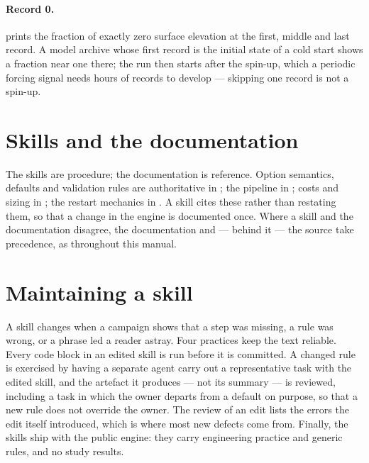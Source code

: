 \paragraph{Record 0.}  prints the fraction of exactly zero surface elevation at
the first, middle and last record. A model archive whose first record is the initial state of a cold
start shows a fraction near one there; the run then starts after the spin-up, which a periodic
forcing signal needs hours of records to develop --- skipping one record is not a spin-up.


\section{Skills and the documentation}\label{sec:skills-docs}

The skills are procedure; the documentation is reference. Option semantics, defaults and validation
rules are authoritative in ; the pipeline in
; costs and sizing in ; the restart
mechanics in . A skill cites these rather than restating them, so that
a change in the engine is documented once. Where a skill and the documentation disagree, the
documentation and --- behind it --- the source take precedence, as throughout this manual.

\section{Maintaining a skill}\label{sec:skills-maintain}

A skill changes when a campaign shows that a step was missing, a rule was wrong, or a phrase led a
reader astray. Four practices keep the text reliable. Every code block in an edited skill is run
before it is committed. A changed rule is exercised by having a separate agent carry out a
representative task with the edited skill, and the artefact it produces --- not its summary --- is
reviewed, including a task in which the owner departs from a default on purpose, so that a new rule
does not override the owner. The review of an edit lists the errors the edit itself introduced, which
is where most new defects come from. Finally, the skills ship with the public engine: they carry
engineering practice and generic rules, and no study results.

